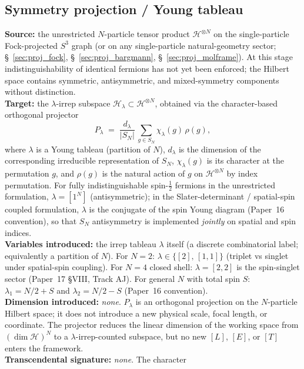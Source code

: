 \documentclass[11pt]{article}
\begin{document}
\subsection{Symmetry projection / Young tableau}
\label{sec:proj_symmetry_tableau}
\textbf{Source:} the unrestricted $N$-particle tensor product
$\mathcal{H}^{\otimes N}$ on the single-particle Fock-projected $S^3$
graph (or on any single-particle natural-geometry sector;
\S~\ref{sec:proj_fock}, \S~\ref{sec:proj_bargmann},
\S~\ref{sec:proj_molframe}).  At this stage indistinguishability of
identical fermions has not yet been enforced; the Hilbert space
contains symmetric, antisymmetric, and mixed-symmetry components
without distinction.\\
\textbf{Target:} the $\lambda$-irrep subspace
$\mathcal{H}_\lambda \subset \mathcal{H}^{\otimes N}$, obtained via
the character-based orthogonal projector
\[
  P_\lambda \;=\; \frac{d_\lambda}{|S_N|}\,\sum_{g \in S_N}
                  \chi_\lambda(g)\,\rho(g),
\]
where $\lambda$ is a Young tableau (partition of $N$), $d_\lambda$ is
the dimension of the corresponding irreducible representation of
$S_N$, $\chi_\lambda(g)$ is its character at the permutation $g$, and
$\rho(g)$ is the natural action of $g$ on $\mathcal{H}^{\otimes N}$
by index permutation.  For fully indistinguishable spin-$\tfrac{1}{2}$
fermions in the unrestricted formulation, $\lambda = [1^N]$
(antisymmetric); in the Slater-determinant / spatial-spin coupled
formulation, $\lambda$ is the conjugate of the spin Young diagram
(Paper~16 convention), so that $S_N$
antisymmetry is implemented \emph{jointly} on spatial and spin
indices.\\
\textbf{Variables introduced:} the irrep tableau $\lambda$ itself
(a discrete combinatorial label; equivalently a partition of $N$).
For $N=2$: $\lambda \in \{[2],\,[1,1]\}$ (triplet vs singlet under
spatial-spin coupling).  For $N=4$ closed shell: $\lambda = [2,2]$
is the spin-singlet sector (Paper~17 §VIII, Track AJ).  For general
$N$ with total spin $S$: $\lambda_1 = N/2 + S$ and
$\lambda_2 = N/2 - S$ (Paper~16 convention).\\
\textbf{Dimension introduced:} \emph{none}.  $P_\lambda$ is an
orthogonal projection on the $N$-particle Hilbert space; it does not
introduce a new physical scale, focal length, or coordinate.  The
projector reduces the linear dimension of the working space from
$(\dim\mathcal{H})^N$ to a $\lambda$-irrep-counted subspace, but no
new $[L]$, $[E]$, or $[T]$ enters the framework.\\
\textbf{Transcendental signature:} \textit{none}.  The character
\end{document}
